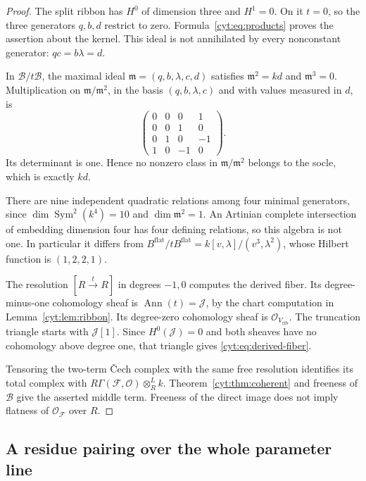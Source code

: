 \begin{proof}
The split ribbon has \(H^0\) of dimension three and
\(H^1=0\). On it \(t=0\), so the three generators
\(q,b,d\) restrict to zero. Formula~\eqref{cyt:eq:products}
proves the assertion about the kernel. This ideal is not
annihilated by every nonconstant generator: \(qc=b\lambda=d\).

In \(\mathcal B/t\mathcal B\), the maximal ideal
\(\mathfrak m=(q,b,\lambda,c,d)\) satisfies
\(\mathfrak m^2=kd\) and \(\mathfrak m^3=0\).
Multiplication on \(\mathfrak m/\mathfrak m^2\), in the
basis \((q,b,\lambda,c)\) and with values measured in \(d\), is
\[
 \begin{pmatrix}
 0&0&0&1\\
 0&0&1&0\\
 0&1&0&-1\\
 1&0&-1&0
 \end{pmatrix}.
\]
Its determinant is one. Hence no nonzero class in
\(\mathfrak m/\mathfrak m^2\) belongs to the socle, which
is exactly \(kd\).

There are nine independent quadratic
relations among four minimal generators, since
\(\dim\operatorname{Sym}^2(k^4)=10\) and
\(\dim\mathfrak m^2=1\). An Artinian complete intersection
of embedding dimension four has four defining relations,
so this algebra is not one. In particular it differs from
\(B^{\mathrm{flat}}/tB^{\mathrm{flat}}
=k[v,\lambda]/(v^3,\lambda^2)\), whose Hilbert function
is \((1,2,2,1)\).

The resolution \([R\xrightarrow{t}R]\) in degrees \(-1,0\)
computes the derived fiber. Its degree-minus-one cohomology
sheaf is \(\operatorname{Ann}(t)=\mathcal J\), by the
chart computation in Lemma~\ref{cyt:lem:ribbon}. Its
degree-zero cohomology sheaf is \(\mathcal O_{V_{\mathrm{rib}}}\).
The truncation triangle starts with \(\mathcal J[1]\).
Since \(H^0(\mathcal J)=0\) and both sheaves have no
cohomology above degree one, that triangle gives
\eqref{cyt:eq:derived-fiber}.

Tensoring the two-term \v Cech
complex with the same free resolution identifies its total
complex with \(R\Gamma(\mathscr F,\mathcal O)\otimes_R^L k\).
Theorem~\ref{cyt:thm:coherent} and freeness of \(\mathcal B\)
give the asserted middle term. Freeness of the direct image
does not imply flatness of \(\mathcal O_{\mathscr F}\) over \(R\).
\end{proof}

\subsection{A residue pairing over the whole parameter line}

